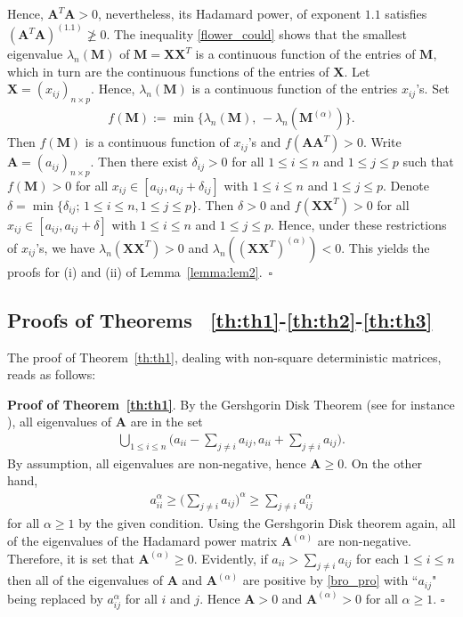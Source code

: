 \documentclass[conference,letterpaper]{IEEEtran}
\numberwithin{equation}{section}
\newcommand{\lbl}{\label}
\newcommand{\beaa}{\begin{eqnarray*}}
\newcommand{\eeaa}{\end{eqnarray*}}
\newcommand{\bea}{\begin{eqnarray}}
\newcommand{\eea}{\end{eqnarray}}
\begin{document}
Hence, $\mathbf{A}^T\mathbf{A}>0$, nevertheless, its Hadamard power, of exponent $1.1$ satisfies $(\mathbf{A}^T\mathbf{A})^{(1.1)} \ngeqslant 0$.
The inequality \eqref{flower_could} shows that the smallest eigenvalue $\lambda_n(\mathbf{M})$ of $\mathbf{M}=\mathbf{X}\mathbf{X}^T$ is a continuous function of the entries of $\mathbf{M}$, which in turn are the continuous functions of the entries of $\mathbf{X}$. 
Let $\mathbf{X}=(x_{ij})_{n\times p}$.
Hence, $\lambda_n(\mathbf{M})$ is a continuous function of the entries $x_{ij}$'s. 
Set
 \beaa
f(\mathbf{M}):=\min\big\{\lambda_n(\mathbf{M}),\, -\lambda_n(\mathbf{M}^{(\alpha)})\big\}.
\eeaa
Then $f(\mathbf{M})$ is a continuous function of $x_{ij}$'s and $f(\mathbf{A}\mathbf{A}^T)>0.$ Write  $\mathbf{A}=(a_{ij})_{n\times p}$. Then there exist $\delta_{ij}>0$ for all $1\leq i\leq n$ and $1\leq j \leq p$ such that $f(\mathbf{M})>0$ for all $x_{ij}\in [a_{ij}, a_{ij}+\delta_{ij}]$ with $1\leq i\leq n$ and $1\leq j \leq p$. Denote $\delta=\min\{\delta_{ij};\, 1\leq i\leq n, 1\leq j \leq p\}.$ Then $\delta>0$ and $f(\mathbf{X}\mathbf{X}^T)>0$ for all $x_{ij}\in [a_{ij}, a_{ij}+\delta]$ with $1\leq i\leq n$ and $1\leq j \leq p$. Hence, under these restrictions of $x_{ij}$'s, we have $\lambda_n(\mathbf{X}\mathbf{X}^T)>0$ and $\lambda_n((\mathbf{X}\mathbf{X}^T)^{(\alpha)}) < 0$. This yields the proofs for (i) and (ii) of Lemma~\ref{lemma:lem2}.~\hfill$\square$

\medskip


\subsection{Proofs of Theorems ~\ref{th:th1}-\ref{th:th2}-\ref{th:th3}}
The proof of Theorem~\ref{th:th1}, dealing with non-square deterministic matrices, reads as follows:

\noindent\textbf{Proof of Theorem~\ref{th:th1}}. 
By the Gershgorin Disk Theorem (see for instance \cite{horn1985}), all eigenvalues of $\mathbf{A}$ are in the set
\bea\lbl{bro_pro}
\bigcup_{1\leq i \leq n}\Big(a_{ii}- \sum_{j\ne i}a_{ij}, a_{ii}+ \sum_{j\ne i}a_{ij}\Big).
\eea
By assumption, all eigenvalues are non-negative, hence $\mathbf{A}\geq 0$. On the other hand,
\beaa
a_{ii}^{\alpha}\geq  \Big(\sum_{j\ne i}a_{ij}\Big)^{\alpha}\geq \sum_{j\ne i}a_{ij}^{\alpha}
\eeaa
for all $\alpha\geq 1$ by the given condition. 
Using the Gershgorin Disk theorem again, all of the eigenvalues of the Hadamard power matrix $\mathbf{A}^{(\alpha)}$ are non-negative. 
Therefore,  it is set that $\mathbf{A}^{(\alpha)}\geq  0$.
Evidently, if $a_{ii}>  \sum_{j\ne i}a_{ij}$ for each $1\leq i\leq n$ then all of the eigenvalues of  $\mathbf{A}$  and $\mathbf{A}^{(\alpha)}$ are positive by \eqref{bro_pro} with ``$a_{ij}$" being replaced by $a_{ij}^{\alpha}$ for all $i$ and $j$. Hence $\mathbf{A} > 0$ and $\mathbf{A}^{(\alpha)}> 0$ for all $\alpha\geq 1.$ \hfill$\square$
\medskip
\end{document}
